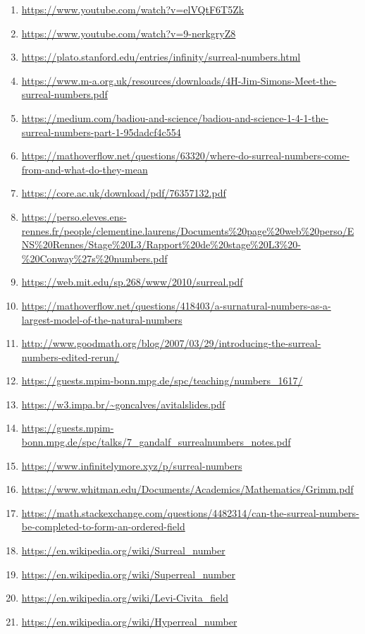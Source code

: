 \begin{enumerate}
    \item \url{https://www.youtube.com/watch?v=elVQtF6T5Zk}
    \item \url{https://www.youtube.com/watch?v=9-nerkgryZ8}
    \item \url{https://plato.stanford.edu/entries/infinity/surreal-numbers.html}
    \item \url{https://www.m-a.org.uk/resources/downloads/4H-Jim-Simons-Meet-the-surreal-numbers.pdf}
    \item \url{https://medium.com/badiou-and-science/badiou-and-science-1-4-1-the-surreal-numbers-part-1-95dadcf4c554}
    \item \url{https://mathoverflow.net/questions/63320/where-do-surreal-numbers-come-from-and-what-do-they-mean}
    \item \url{https://core.ac.uk/download/pdf/76357132.pdf}
    \item \url{https://perso.eleves.ens-rennes.fr/people/clementine.laurens/Documents\%20page\%20web\%20perso/ENS\%20Rennes/Stage\%20L3/Rapport\%20de\%20stage\%20L3\%20-\%20Conway\%27s\%20numbers.pdf}
    \item \url{https://web.mit.edu/sp.268/www/2010/surreal.pdf}
    \item \url{https://mathoverflow.net/questions/418403/a-surnatural-numbers-as-a-largest-model-of-the-natural-numbers}
    \item \url{http://www.goodmath.org/blog/2007/03/29/introducing-the-surreal-numbers-edited-rerun/}
    \item \url{https://guests.mpim-bonn.mpg.de/spc/teaching/numbers_1617/}
    \item \url{https://w3.impa.br/~goncalves/avitalslides.pdf}
    \item \url{https://guests.mpim-bonn.mpg.de/spc/talks/7_gandalf_surrealnumbers_notes.pdf}
    \item \url{https://www.infinitelymore.xyz/p/surreal-numbers}
    \item \url{https://www.whitman.edu/Documents/Academics/Mathematics/Grimm.pdf}
    \item \url{https://math.stackexchange.com/questions/4482314/can-the-surreal-numbers-be-completed-to-form-an-ordered-field}
    \item \url{https://en.wikipedia.org/wiki/Surreal_number}
    \item \url{https://en.wikipedia.org/wiki/Superreal_number}
    \item \url{https://en.wikipedia.org/wiki/Levi-Civita_field}
    \item \url{https://en.wikipedia.org/wiki/Hyperreal_number}

\end{enumerate}
